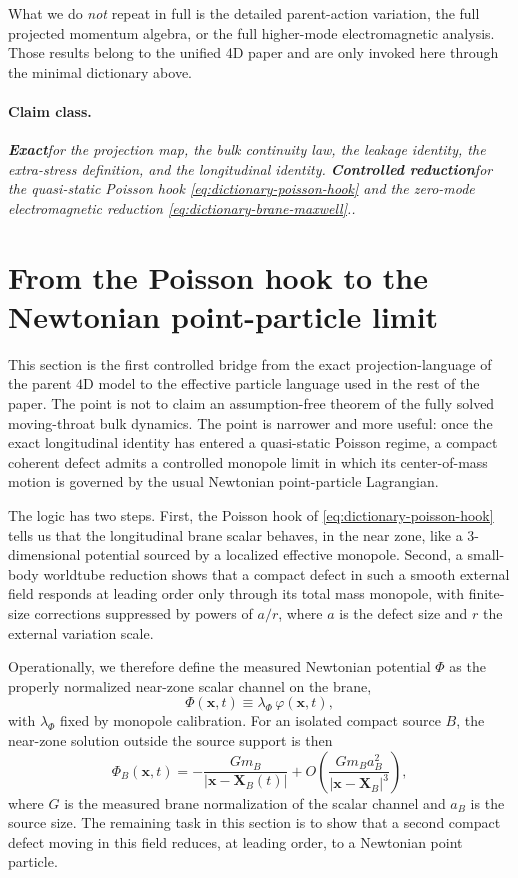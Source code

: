 \documentclass[11pt]{article}
\newcommand{\x}{\mathbf x}
\newcommand{\PhiN}{\Phi}
\newcommand{\phibr}{\varphi}
\newcommand{\Exact}{\textbf{Exact}}
\newcommand{\Controlled}{\textbf{Controlled reduction}}
\newcommand{\claimclass}[1]{\paragraph{Claim class.}\emph{#1.}}
\begin{document}
What we do \emph{not} repeat in full is the detailed parent-action variation, the full
projected momentum algebra, or the full higher-mode electromagnetic analysis. Those
results belong to the unified 4D paper and are only invoked here through the minimal
dictionary above.

\claimclass{\Exact for the projection map, the bulk continuity law, the leakage identity,
the extra-stress definition, and the longitudinal identity. \Controlled for the
quasi-static Poisson hook \eqref{eq:dictionary-poisson-hook} and the zero-mode
electromagnetic reduction \eqref{eq:dictionary-brane-maxwell}.}


\section{From the Poisson hook to the Newtonian point-particle limit}
\label{sec:newtonian-limit}

This section is the first controlled bridge from the exact projection-language of the
parent \(4\)D model to the effective particle language used in the rest of the paper.
The point is not to claim an assumption-free theorem of the fully solved moving-throat
bulk dynamics. The point is narrower and more useful: once the exact longitudinal
identity has entered a quasi-static Poisson regime, a compact coherent defect admits a
controlled monopole limit in which its center-of-mass motion is governed by the usual
Newtonian point-particle Lagrangian.

The logic has two steps. First, the Poisson hook of
\cref{eq:dictionary-poisson-hook} tells us that the longitudinal brane scalar behaves,
in the near zone, like a \(3\)-dimensional potential sourced by a localized effective
monopole. Second, a small-body worldtube reduction shows that a compact defect in such a
smooth external field responds at leading order only through its total mass monopole,
with finite-size corrections suppressed by powers of \(a/r\), where \(a\) is the defect
size and \(r\) the external variation scale.

Operationally, we therefore define the measured Newtonian potential \(\PhiN\) as the
properly normalized near-zone scalar channel on the brane,
\begin{equation}
\PhiN(\x,t)\equiv \lambda_\Phi\,\phibr(\x,t),
\label{eq:newtonian-potential-definition}
\end{equation}
with \(\lambda_\Phi\) fixed by monopole calibration. For an isolated compact source \(B\),
the near-zone solution outside the source support is then
\begin{equation}
\Phi_B(\x,t)
=
-\frac{Gm_B}{|\x-\mathbf X_B(t)|}
+ O\!\left(\frac{Gm_B a_B^2}{|\x-\mathbf X_B|^3}\right),
\label{eq:isolated-source-newtonian-potential}
\end{equation}
where \(G\) is the measured brane normalization of the scalar channel and \(a_B\) is the
source size. The remaining task in this section is to show that a second compact defect
moving in this field reduces, at leading order, to a Newtonian point particle.
\end{document}
